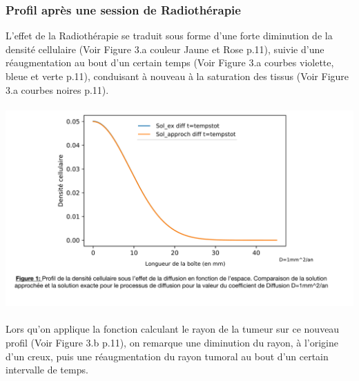 \documentclass[12pt,a4paper]{article}
\begin{document}
\subsubsection{Profil après une session de Radiothérapie}
L'effet de la Radiothérapie se traduit sous forme d'une forte diminution de la densité cellulaire (Voir Figure 3.a couleur Jaune et Rose p.11), suivie d'une réaugmentation au bout d'un certain temps (Voir Figure 3.a  courbes violette, bleue et verte p.11), conduisant à nouveau à la saturation des tissus (Voir Figure 3.a courbes noires p.11). 
\\
\\
\includegraphics[page=3,scale=0.25]{FIGURES.pdf}
\\
\\
Lors qu'on applique la fonction calculant le rayon de la tumeur sur ce nouveau profil (Voir Figure 3.b p.11), on remarque une diminution du rayon, à l'origine d'un creux, puis une réaugmentation du rayon tumoral au bout d'un certain intervalle de temps.
\\
\end{document}
